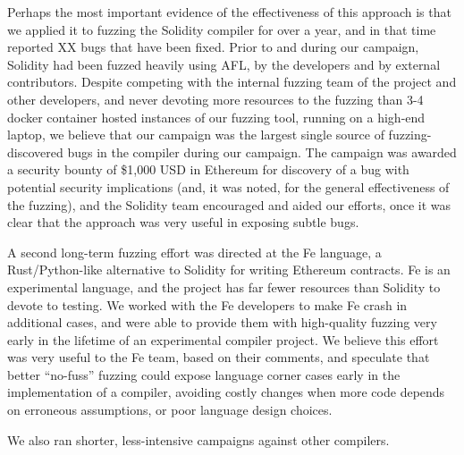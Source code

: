 Perhaps the most important evidence of the effectiveness of this approach is that we applied it to fuzzing the Solidity compiler for over a year, and in that time reported XX bugs that have been fixed.  Prior to and during our campaign, Solidity had been fuzzed heavily using AFL, by the developers and by external contributors.  Despite competing with the internal fuzzing team of the project and other developers, and never devoting more resources to the fuzzing than 3-4 docker container hosted instances of our fuzzing tool, running on a high-end laptop, we believe that our campaign was the largest single source of fuzzing-discovered bugs in the compiler during our campaign.  The campaign was awarded a security bounty of \$1,000 USD in Ethereum for discovery of a bug with potential security implications (and, it was noted, for the general effectiveness of the fuzzing), and the Solidity team encouraged and aided our efforts, once it was clear that the approach was very useful in exposing subtle bugs.

A second long-term fuzzing effort was directed at the Fe language, a Rust/Python-like alternative to Solidity for writing Ethereum contracts.  Fe is an experimental language, and the project has far fewer resources than Solidity to devote to testing.  We worked with the Fe developers to make Fe crash in additional cases, and were able to provide them with high-quality fuzzing very early in the lifetime of an experimental compiler project.  We believe this effort was very useful to the Fe team, based on their comments, and speculate that better ``no-fuss'' fuzzing could expose language corner cases early in the implementation of a compiler, avoiding costly changes when more code depends on erroneous assumptions, or poor language design choices.

We also ran shorter, less-intensive campaigns against other compilers.
